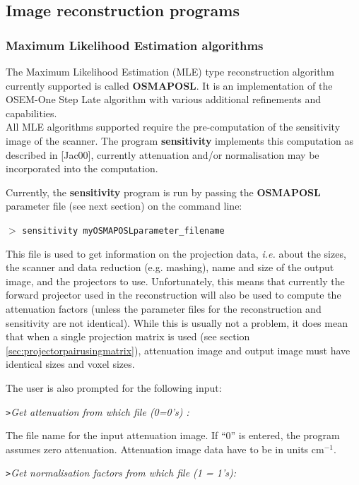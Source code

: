 \documentclass{article}
\newcommand{\cmdline}[1]{\par \noindent $>$ \texttt{#1}\par}
\begin{document}
\subsection{
Image reconstruction programs}




\subsubsection{
Maximum Likelihood Estimation algorithms}

The Maximum Likelihood Estimation (MLE) type reconstruction algorithm 
currently supported is called \textbf{OSMAPOSL}. It is an implementation 
of the OSEM-One Step Late algorithm with various additional refinements 
and capabilities.\\
All MLE algorithms supported require the pre-computation of the 
sensitivity image of the scanner. The program \textbf{sensitivity} 
 implements this computation 
as described in [Jac00], currently attenuation and/or normalisation 
may be incorporated into the computation.

{ 
}
\label{sec:sensitivity}
Currently, the \textbf{sensitivity} program is run by passing the \textbf{OSMAPOSL} parameter 
file (see next section) on the command line:
\cmdline{sensitivity myOSMAPOSLparameter\_filename}


This file is used to get information on the projection data, \textit{i.e.} about 
the sizes, the scanner and data reduction (e.g. mashing), name 
and size of the output image, and the projectors to use. Unfortunately, 
this means that currently the forward projector used in the reconstruction 
will also be used to compute the attenuation factors (unless 
the parameter files for the reconstruction and sensitivity are 
not identical). While this is usually not a problem, it does 
mean that when a single projection matrix is used (see section 
\ref{sec:projectorpairusingmatrix}), 
attenuation image and output image must have identical sizes 
and voxel sizes.


The user is also prompted for the following input:


\texttt{>}\textit{Get attenuation from which file (0=0's) :}


The file name for the input attenuation image. If ``0'' is entered, 
the program assumes zero attenuation. Attenuation image data 
have to be in units cm$^{-1}$.


\textit{\texttt{>}Get normalisation factors from which file (1 = 1's):}
\end{document}

